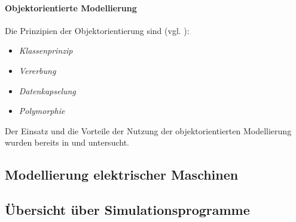 \paragraph{Objektorientierte Modellierung}
Die Prinzipien der Objektorientierung sind (vgl. \cite{notgesObjektorientierteModellierungSimulation2007}):\begin{itemize}
	\item \emph{Klassenprinzip}
	\item \emph{Vererbung}
	\item \emph{Datenkapselung}
	\item \emph{Polymorphie}
\end{itemize}

Der Einsatz und die Vorteile der Nutzung der objektorientierten Modellierung wurden bereits in \cite{gesenhuesObjektorientiertmodellbasierteCharakterisierungUberwachung2019} und \cite{notgesObjektorientierteModellierungSimulation2007} untersucht.

\subsection{Modellierung elektrischer Maschinen}
\label{subsec:ModellierungElektrischerMaschinen}


\subsection{Übersicht über Simulationsprogramme}
\label{subsec:Simulationsprogramme}












